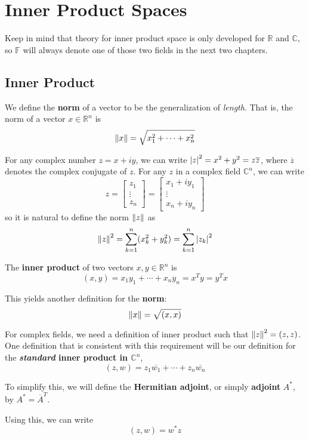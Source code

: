 
\chapter{Inner Product Spaces}

Keep in mind that theory for inner product space is only developed for $\mathbb{R}$ and $\mathbb{C}$, so $\mathbb{F}$ will always denote one of those two fields in the next two chapters. 

\section{Inner Product}

\begin{definition}
We define the \textbf{norm} of a vector to be the generalization of \textit{length}. That is, the norm of a vector $x \in \mathbb{R}^{n}$ is 
$$\norm{x} = \sqrt{x_{1}^{2} + \cdots + x_{n}^{2}}$$

For any complex number $z = x + iy$, we can write $\abs{z}^{2} = x^{2} + y^{2} = z \overline{z}$, where $\overline{z}$ denotes the complex conjugate of $z$. For any $z$ in a complex field $\mathbb{C}^{n}$, we can write 
$$z = \begin{bmatrix}
z_{1} \\
\vdots \\
z_{n}
\end{bmatrix} = \begin{bmatrix}
x_{1} + iy_{1} \\
\vdots \\
x_{n} + iy_{n}
\end{bmatrix}$$
so it is natural to define the norm $\norm{z}$ as 
$$\norm{z}^{2} = \sum_{k = 1}^{n} (x_{k}^{2} + y_{k}^{2}) = \sum_{k=1}^{n} \abs{z_{k}}^{2}$$
\end{definition}

\begin{definition}
The \textbf{inner product} of two vectors $x, y \in \mathbb{R}^{n}$ is
$$(x, y) = x_{1} y_{1} + \cdots + x_{n} y_{n} = x^{T} y = y^{T} x$$

This yields another definition for the \textbf{norm}: 
$$\norm{x} = \sqrt{(x, x)}$$

For complex fields, we need a definition of inner product such that $\norm{z}^{2} = (z, z)$. One definition that is consistent with this requirement will be our definition for the \textbf{\textit{standard} inner product in $\mathbb{C}^{n}$}, 
$$(z, w) = z_{1} \overline{w_{1}} + \cdots + z_{n} \overline{w_{n}}$$

To simplify this, we will define the \textbf{Hermitian adjoint}, or simply \textbf{adjoint} $A^{*}$, by $A^{*} = \overline{A}^{T}$. 

Using this, we can write 
$$(z, w) = w^{*} z$$ 
\end{definition}

